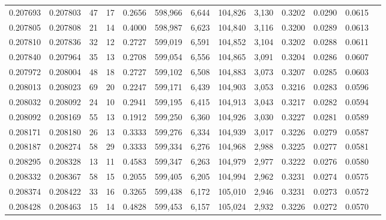 \begin{tabular}{rrrrrrrrrrrrr}
0.207693 & 0.207803 &    47 &  17 &                                     0.2656 & 598,966 &   6,644 & 104,826 &   3,130 & 0.3202 & 0.0290 & 0.0615 \\
0.207805 & 0.207808 &    21 &  14 &                                     0.4000 & 598,987 &   6,623 & 104,840 &   3,116 & 0.3200 & 0.0289 & 0.0613 \\
0.207810 & 0.207836 &    32 &  12 &                                     0.2727 & 599,019 &   6,591 & 104,852 &   3,104 & 0.3202 & 0.0288 & 0.0611 \\
0.207840 & 0.207964 &    35 &  13 &                                     0.2708 & 599,054 &   6,556 & 104,865 &   3,091 & 0.3204 & 0.0286 & 0.0607 \\
0.207972 & 0.208004 &    48 &  18 &                                     0.2727 & 599,102 &   6,508 & 104,883 &   3,073 & 0.3207 & 0.0285 & 0.0603 \\
0.208013 & 0.208023 &    69 &  20 &                                     0.2247 & 599,171 &   6,439 & 104,903 &   3,053 & 0.3216 & 0.0283 & 0.0596 \\
0.208032 & 0.208092 &    24 &  10 &                                     0.2941 & 599,195 &   6,415 & 104,913 &   3,043 & 0.3217 & 0.0282 & 0.0594 \\
0.208092 & 0.208169 &    55 &  13 &                                     0.1912 & 599,250 &   6,360 & 104,926 &   3,030 & 0.3227 & 0.0281 & 0.0589 \\
0.208171 & 0.208180 &    26 &  13 &                                     0.3333 & 599,276 &   6,334 & 104,939 &   3,017 & 0.3226 & 0.0279 & 0.0587 \\
0.208187 & 0.208274 &    58 &  29 &                                     0.3333 & 599,334 &   6,276 & 104,968 &   2,988 & 0.3225 & 0.0277 & 0.0581 \\
0.208295 & 0.208328 &    13 &  11 &                                     0.4583 & 599,347 &   6,263 & 104,979 &   2,977 & 0.3222 & 0.0276 & 0.0580 \\
0.208332 & 0.208367 &    58 &  15 &                                     0.2055 & 599,405 &   6,205 & 104,994 &   2,962 & 0.3231 & 0.0274 & 0.0575 \\
0.208374 & 0.208422 &    33 &  16 &                                     0.3265 & 599,438 &   6,172 & 105,010 &   2,946 & 0.3231 & 0.0273 & 0.0572 \\
0.208428 & 0.208463 &    15 &  14 &                                     0.4828 & 599,453 &   6,157 & 105,024 &   2,932 & 0.3226 & 0.0272 & 0.0570 \\

\end{tabular}
